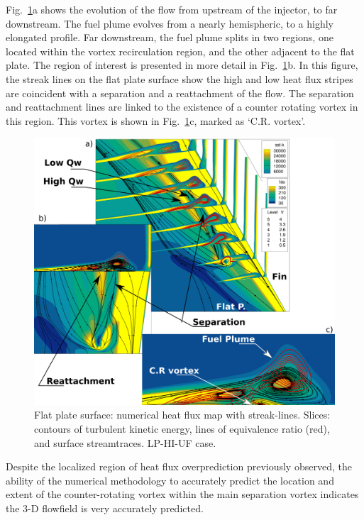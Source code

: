 \documentclass{AIAA}
\begin{document}
Fig.~\ref{fig:Exper_Flowf}a shows the evolution of the flow from upstream of the injector, to far downstream. The fuel plume evolves from a nearly hemispheric, to a highly elongated profile. Far downstream, the fuel plume splits in two regions, one located within the vortex recirculation region, and the other adjacent to the flat plate. The region of interest is presented in more detail in Fig.~\ref{fig:Exper_Flowf}b. In this figure, the streak lines on the flat plate surface show the high and low heat flux stripes are coincident with a separation and a reattachment of the flow. The separation and reattachment lines are linked to the existence of a counter rotating vortex in this region. This vortex is shown in Fig.~\ref{fig:Exper_Flowf}c, marked as `C.R. vortex'.

\begin{figure}[!h]
\center
\includegraphics[trim = 0mm 0mm 0mm 0mm, clip, width=0.95\columnwidth,valign=t]{Figures/Flowfield_Experimental_Vred.pdf}
\caption{Flat plate surface: numerical heat flux map with streak-lines. Slices: contours of turbulent kinetic energy, lines of equivalence ratio (red), and surface streamtraces. LP-HI-UF case.}
\label{fig:Exper_Flowf}
\end{figure} 

Despite the localized region of heat flux overprediction previously observed, the ability of the numerical methodology to accurately predict the location and extent of the counter-rotating vortex within the main separation vortex indicates the 3-D flowfield is very accurately predicted.
\end{document}
